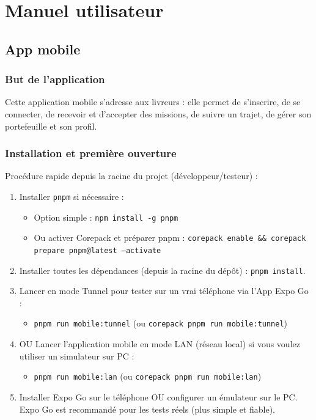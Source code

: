 \newline

\chapter{Manuel utilisateur}

\section{App mobile}
\subsection{But de l'application}
Cette application mobile s'adresse aux livreurs : elle permet de s'inscrire, de se connecter, de recevoir et d'accepter des missions, de suivre un trajet, de gérer son portefeuille et son profil.

\subsection{Installation et première ouverture}
Procédure rapide depuis la racine du projet (développeur/testeur) :
\begin{enumerate}
	\item Installer \texttt{pnpm} si nécessaire :
	\begin{itemize}
		\item Option simple : \texttt{npm install -g pnpm}
		\item Ou activer Corepack et préparer pnpm : \texttt{corepack enable \&\& corepack prepare pnpm@latest --activate}
	\end{itemize}
	\item Installer toutes les dépendances (depuis la racine du dépôt) : \texttt{pnpm install}.
	
	\item Lancer en mode Tunnel pour tester sur un vrai téléphone via l'App Expo Go :
	\begin{itemize}
		\item \texttt{pnpm run mobile:tunnel}  \quad (ou \texttt{corepack pnpm run mobile:tunnel})
	\end{itemize}
    \item OU Lancer l'application mobile en mode LAN (réseau local) si vous voulez utiliser un simulateur sur PC :
	\begin{itemize}
		\item \texttt{pnpm run mobile:lan}  \quad (ou \texttt{corepack pnpm run mobile:lan})
	\end{itemize}
	\item Installer Expo Go sur le téléphone OU configurer un émulateur sur le PC. Expo Go est recommandé pour les tests réels (plus simple et fiable).
\end{enumerate}

